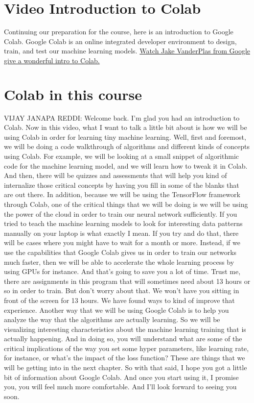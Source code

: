 \section{Video Introduction to Colab}

Continuing our preparation for the course, here is an introduction to Google Colab. Google Colab is an online integrated developer environment to design, train, and test our machine learning models. \href{https://www.youtube.com/watch?v=inN8seMm7UI}{Watch Jake VanderPlas from Google give a wonderful intro to Colab.}

\section{Colab in this course}

VIJAY JANAPA REDDI: Welcome back.
I'm glad you had an introduction to Colab.
Now in this video, what I want to talk a little bit about
is how we will be using Colab in order for learning tiny machine learning.
Well, first and foremost, we will be doing
a code walkthrough of algorithms and different kinds of concepts
using Colab.
For example, we will be looking at a small snippet
of algorithmic code for the machine learning model,
and we will learn how to tweak it in Colab.
And then, there will be quizzes and assessments
that will help you kind of internalize those critical concepts by having
you fill in some of the blanks that are out there.
In addition, because we will be using the TensorFlow framework through Colab,
one of the critical things that we will be doing
is we will be using the power of the cloud
in order to train our neural network sufficiently.
If you tried to teach the machine learning models
to look for interesting data patterns manually on your laptop is what exactly
I mean.
If you try and do that, there will be cases where you
might have to wait for a month or more.
Instead, if we use the capabilities that Google Colab gives us in order
to train our networks much faster, then we
will be able to accelerate the whole learning
process by using GPUs for instance.
And that's going to save you a lot of time.
Trust me, there are assignments in this program that will sometimes need
about 13 hours or so in order to train.
But don't worry about that.
We won't have you sitting in front of the screen for 13 hours.
We have found ways to kind of improve that experience.
Another way that we will be using Google Colab
is to help you analyze the way that the algorithms are actually learning.
So we will be visualizing interesting characteristics
about the machine learning training that is actually happening.
And in doing so, you will understand what
are some of the critical implications of the way you set some hyper
parameters, like learning rate, for instance,
or what's the impact of the loss function?
These are things that we will be getting into in the next chapter.
So with that said, I hope you got a little bit of information
about Google Colab.
And once you start using it, I promise you,
you will feel much more comfortable.
And I'll look forward to seeing you soon.

